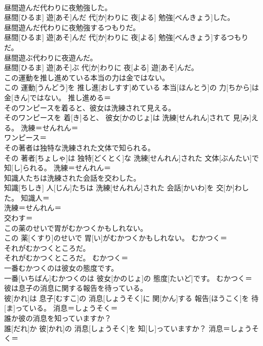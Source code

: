 \documentclass[8pt]{extreport}
\begin{document}
\begin{CJK}{UTF8}{min}
\\	昼間遊んだ代わりに夜勉強した。	
\\	昼間[ひるま] 遊[あそ]んだ 代[か]わりに 夜[よる] 勉強[べんきょう]した。	
\\	昼間遊んだ代わりに夜勉強するつもりだ。	
\\	昼間[ひるま] 遊[あそ]んだ 代[か]わりに 夜[よる] 勉強[べんきょう]するつもりだ。	
\\	昼間遊ぶ代わりに夜遊んだ。	
\\	昼間[ひるま] 遊[あそ]ぶ 代[か]わりに 夜[よる] 遊[あそ]んだ。	
\\	この運動を推し進めている本当の力は金ではない。	
\\	この 運動[うんどう]を 推し進[おしすす]めている 本当[ほんとう]の 力[ちから]は 金[きん]ではない。	推し進める＝ 
\\	そのワンピースを着ると、彼女は洗練されて見える。	
\\	そのワンピースを 着[き]ると、 彼女[かのじょ]は 洗練[せんれん]されて 見[み]える。	洗練＝せんれん＝ 
\\	ワンピース＝ 
\\	その著者は独特な洗練された文体で知られる。	
\\	その 著者[ちょしゃ]は 独特[どくとく]な 洗練[せんれん]された 文体[ぶんたい]で 知[し]られる。	洗練＝せんれん＝ 
\\	知識人たちは洗練された会話を交わした。	
\\	知識[ちしき] 人[じん]たちは 洗練[せんれん]された 会話[かいわ]を 交[か]わした。	知識人＝ 
\\	洗練＝せんれん＝ 
\\	交わす＝ 
\\	この薬のせいで胃がむかつくかもしれない。	
\\	この 薬[くすり]のせいで 胃[い]がむかつくかもしれない。	むかつく＝ 
\\	それがむかつくところだ。	
\\	それがむかつくところだ。	むかつく＝ 
\\	一番むかつくのは彼女の態度です。	
\\	一番[いちばん]むかつくのは 彼女[かのじょ]の 態度[たいど]です。	むかつく＝ 
\\	彼は息子の消息に関する報告を待っている。	
\\	彼[かれ]は 息子[むすこ]の 消息[しょうそく]に 関[かん]する 報告[ほうこく]を 待[ま]っている。	消息＝しょうそく＝ 
\\	誰か彼の消息を知っていますか？	
\\	誰[だれ]か 彼[かれ]の 消息[しょうそく]を 知[し]っていますか？	消息＝しょうそく＝ 

\end{CJK}
\end{document}
